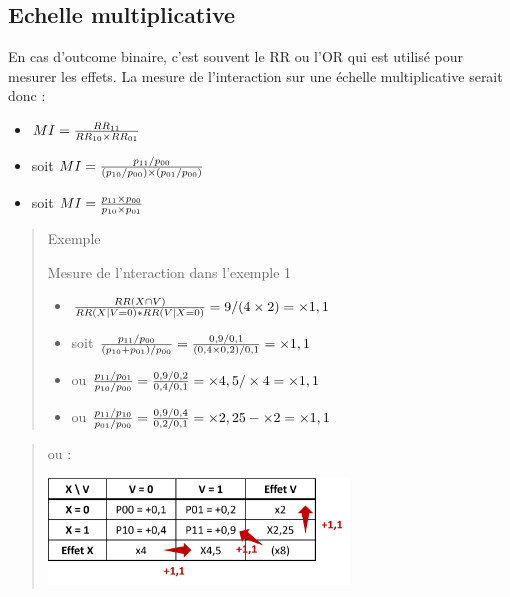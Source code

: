 \documentclass[
]{book}
\providecommand{\tightlist}{%
  \setlength{\itemsep}{0pt}\setlength{\parskip}{0pt}}
\begin{document}
\hypertarget{echelle-multiplicative}{%
\subsection*{Echelle multiplicative}\label{echelle-multiplicative}}

En cas d'outcome binaire, c'est souvent le RR ou l'OR qui est utilisé pour mesurer les effets. La mesure de l'interaction sur une échelle multiplicative serait donc \citet{vanderweele_tutorial_2014} :

\begin{itemize}
\tightlist
\item
  \(\small MI = \frac{RR_{11}}{RR_{10} \times RR_{01}}\)
\item
  soit \(\small MI = \frac{p_{11} / p_{00}}{(p_{10} / p_{00}) \times (p_{01} / p_{00})}\)
\item
  soit \(\small MI = \frac{p_{11} \times p_{00}}{p_{10} \times p_{01}}\)
\end{itemize}

\begin{quote}
Exemple

Mesure de l'nteraction dans l'exemple 1

\begin{itemize}
\tightlist
\item
  \(\small \frac{RR(X\cap V)}{RR(X| V=0)*RR(V|X=0)} = 9/(4 \times 2) = \times 1,1\)
\item
  soit \(\small\frac{p_{11} / p_{00}}{(p_{10} + p_{01}) / p_{00}} = \frac{0,9 / 0,1}{(0,4 \times 0,2) / 0,1} = \times 1,1\)
\item
  ou \(\small \frac{p_{11} / p_{01}}{p_{10} / p_{00}} = \frac{0,9 / 0,2}{0,4 / 0,1} = \times 4,5 / \times 4 = \times 1,1\)
\item
  ou \(\small \frac{p_{11} / p_{10}}{p_{01} / p_{00}} = \frac{0,9 / 0,4}{0,2 / 0,1} = \times 2,25 - \times 2 = \times 1,1\)
\end{itemize}
\end{quote}

\begin{quote}
ou :

\includegraphics[width=0.65\textwidth,height=\textheight]{img/Image3.png}
\end{quote}
\end{document}
